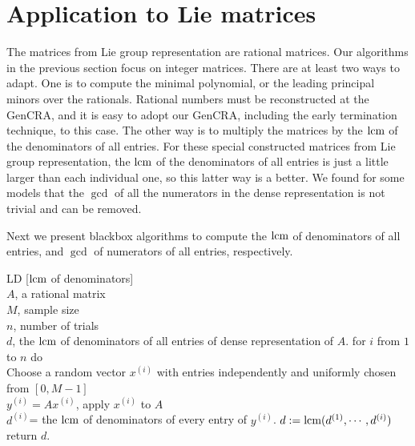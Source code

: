 \section {Application to Lie matrices}
The matrices from Lie group representation are rational matrices.
Our algorithms in the previous section focus on integer matrices.
There are at least two ways to adapt.
One is to compute the minimal polynomial, or the leading principal minors
over the rationals.
Rational numbers must be reconstructed at the GenCRA,
and it is easy to adopt our GenCRA, including the early termination technique,
to this case.
The other way is to multiply the matrices by the $\mbox{lcm}$ of
the denominators of all entries.
For these special constructed matrices from Lie group representation, 
the $\mbox{lcm}$ of the denominators of all entries
is just a little larger than each individual one,
so this latter way is a better.
We found for some models that the $\gcd$ of all the
numerators in the dense representation is not trivial and  can be removed.

Next we present blackbox algorithms to compute the
$\mbox{lcm}$ of denominators of all entries, 
and $\gcd$ of numerators of all entries,
respectively.
\begin{algorithm} {LD [$\mbox{lcm}$ of denominators]}
\Inspec \\
$A$, a rational matrix\\
$M$, sample size\\
$n$, number of trials
\Outspec \\
$d$, the $\mbox{lcm}$ of denominators of all entries of dense representation of $A$.
\Stmt[1.]
for $i$ from $1$ to $n$ do\\
Choose a random vector $x^{(i)}$ with entries independently and uniformly chosen
from $[0, M-1]$\\
$y^{(i)} = A x^{(i)}$, apply $x^{(i)}$ to $A$\\
$d^{(i)}$= the $\mbox{lcm}$ of denominators of every entry of $y^{(i)}$.
\Stmt[2.]
$d := \mbox{lcm} (d^{(1)}, \cdots, d^{(i)})$
\Stmt[3.]
return $d$.
\end{algorithm}

